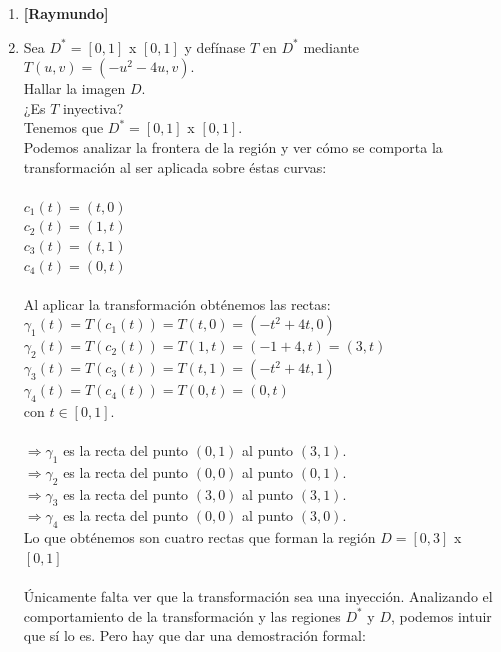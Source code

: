 \documentclass[10pt,letterpaper,fleqn]{article}
\begin{document}
    \begin{enumerate}

        \item \textbf{[Raymundo]}

        \item Sea $D^* = [0,1]$ x $[0, 1]$ y defínase $T$ en $D^*$ mediante $T(u, v) = (-u^2 - 4u, v).$\\
        Hallar la imagen $D$.\\
        ¿Es $T$ inyectiva?\\
        
        Tenemos que $D^* = [0,1]$ x $[0,1]$.\\
        Podemos analizar la frontera de la región y ver cómo se comporta la transformación al ser aplicada sobre éstas curvas:\\\\
        $c_1(t) = (t, 0)$\\
        $c_2(t) = (1, t)$\\
        $c_3(t) = (t, 1)$\\
        $c_4(t) = (0, t)$\\\\
        Al aplicar la transformación obténemos las rectas:\\
        $\gamma_1(t) = T(c_1(t)) = T(t, 0) = (-t^2 + 4t, 0)$\\
        $\gamma_2(t) = T(c_2(t)) = T(1, t) = (-1 + 4, t) = (3, t)$\\
		$\gamma_3(t) = T(c_3(t)) = T(t, 1) = (-t^2 + 4t, 1)$\\        
        $\gamma_4(t) = T(c_4(t)) = T(0, t) = (0, t)$\\
        con $t \in [0,1]$.\\\\
        $\Rightarrow \gamma_1$ es la recta del punto $(0,1)$ al punto $(3,1)$.\\
        $\Rightarrow \gamma_2$ es la recta del punto $(0,0)$ al punto $(0,1)$.\\
        $\Rightarrow \gamma_3$ es la recta del punto $(3,0)$ al punto $(3,1)$.\\
        $\Rightarrow \gamma_4$ es la recta del punto $(0,0)$ al punto $(3,0)$.\\
        Lo que obténemos son cuatro rectas que forman la región $D = [0, 3]$ x $[0, 1]$\\\\       
        Únicamente falta ver que la transformación sea una inyección. Analizando el comportamiento de la transformación y las regiones $D^*$ y $D$, podemos intuir que sí lo es. Pero hay que dar una demostración formal:

\end{enumerate}
\end{document}

